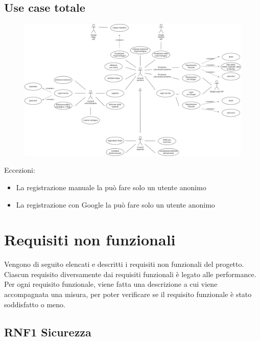 \documentclass[a4paper,12pt]{article}
\begin{document}
\subsection*{Use case totale}
\begin{figure}[H]
   \centering
    \includegraphics[width=1.29\textwidth, angle = 90]{img/use_case_completo.png}
    
\end{figure}
Eccezioni:
\begin{itemize}
    \item La registrazione manuale la può fare solo un utente anonimo
    \item La registrazione con Google la può fare solo un utente anonimo
\end{itemize}{}



{\newpage}
\section{Requisiti non funzionali}

Vengono di seguito elencati e descritti i requisiti non funzionali del progetto. Ciascun requisito diversamente dai requisiti funzionali è legato alle performance.\\
Per ogni requisito funzionale, viene fatta una descrizione a cui viene accompagnata una misura, per poter verificare se il requisito funzionale è stato soddisfatto o meno.

\subsection*{RNF1 Sicurezza}
\end{document}
